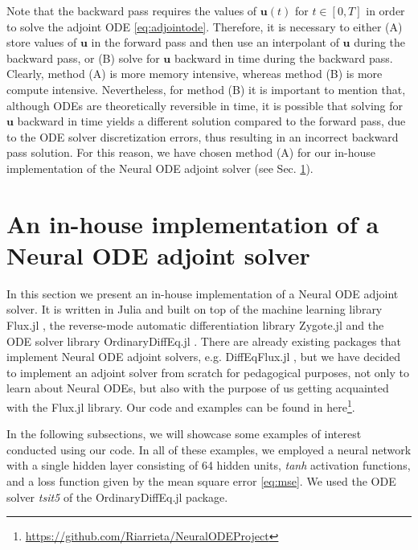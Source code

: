 \documentclass[final,onefignum,onetabnum]{siamart220329}
\newcommand{\bol}{\boldsymbol}
\newcounter{example}
\begin{document}
Note that the backward pass requires the values of $\bol u(t)$ for $t\in [0,T]$ in order to solve the adjoint ODE \eqref{eq:adjointode}. Therefore, it is necessary to either (A) store values of $\bol u$ in the forward pass and then use an interpolant of $\bol u$ during the backward pass, or (B) solve for $\bol u$ backward in time during the backward pass. Clearly, method (A) is more memory intensive, whereas method (B) is more compute intensive. Nevertheless, for method (B) it is important to mention that, although ODEs are theoretically reversible in time, it is possible that solving for $\bol u$ backward in time yields a different solution compared to the forward pass, due to the ODE solver discretization errors, thus resulting in an incorrect backward pass solution. For this reason, we have chosen method (A) for our in-house implementation of the Neural ODE adjoint solver (see Sec. \ref{sec:imple}). 

\section{An in-house implementation of a Neural ODE adjoint solver} \label{sec:imple}
In this section we present an in-house implementation of a Neural ODE adjoint solver. It is written in Julia and built on top of the machine learning library Flux.jl \cite{Flux.jl-2018}, the reverse-mode automatic differentiation library Zygote.jl \cite{Zygote.jl-2018} and the ODE solver library OrdinaryDiffEq.jl \cite{DifferentialEquations.jl-2017}. There are already existing packages that implement Neural ODE adjoint solvers, e.g. DiffEqFlux.jl \cite{DiffEqFlux.jl}, but we have decided to implement an adjoint solver from scratch for pedagogical purposes, not only to learn about Neural ODEs, but also with the purpose of us getting acquainted with the Flux.jl library. Our code and examples can be found in here\footnote{\url{https://github.com/Riarrieta/NeuralODEProject}}.

In the following subsections, we will showcase some examples of interest conducted using our code. In all of these examples, we employed a neural network with a single hidden layer consisting of 64 hidden units, \textit{tanh} activation functions, and a loss function given by the mean square error \eqref{eq:mse}. We used the ODE solver \textit{tsit5} of the OrdinaryDiffEq.jl package. 
\end{document}
